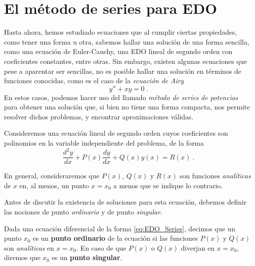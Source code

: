 \section{El método de series para EDO}

Hasta ahora, hemos estudiado ecuaciones que al cumplir ciertas propiedades, como tener una forma u otra, sabemos hallar una solución de una forma sencilla, como una ecuación de Euler-Cauchy, una EDO lineal de segundo orden con coeficientes constantes, entre otras. Sin embargo, existen algunas ecuaciones que pese a aparentar ser sencillas, no es posible hallar una solución en términos de funciones conocidas, como es el caso de la \emph{ecuación de Airy}
\begin{equation}
    y'' + xy = 0 \ .
\end{equation}
En estos casos, podemos hacer uso del llamado \emph{método de series de potencias} para obtener una solución que, si bien no tiene una forma compacta, nos permite resolver dichos problemas, y encontrar aproximaciones válidas.


Consideremos una ecuación lineal de segundo orden cuyos coeficientes son polinomios en la variable independiente del problema, de la forma
\begin{equation} \label{eq:EDO_Series}
    \frac{d^2 y}{dx} + P(x) \frac{dy}{dx} + Q(x) y(x) = R(x) \ .
\end{equation}

En general, consideraremos que $P(x)$, $Q(x)$ y $R(x)$ son funciones \emph{analíticas} de $x$ en, al menos, un punto $x=x_0$ a menos que se indique lo contrario.

Antes de discutir la existencia de soluciones para esta ecuación, debemos definir las nociones de punto \emph{ordinario} y de punto \emph{singular}.

\begin{defi} 
    Dada una ecuación diferencial de la forma \eqref{eq:EDO_Series}, decimos que un punto $x_0$ es un \textbf{punto ordinario} de la ecuación si las funciones $P(x)$ y $Q(x)$ son \emph{analíticas} en $x=x_0$. En caso de que $P(x)$ o $Q(x)$ diverjan en $x = x_0$, diremos que $x_0$ es un \textbf{punto singular}. 
\end{defi}

